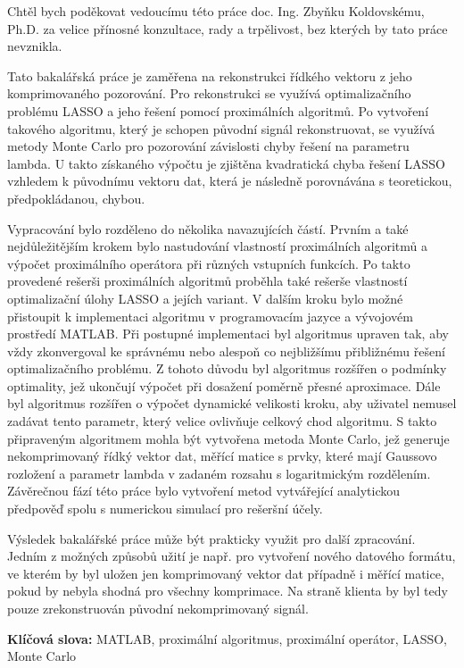 \documentclass[FM,BP]{tulthesis}
\begin{document}
\begin{acknowledgement}
Chtěl bych poděkovat vedoucímu této práce doc. Ing. Zbyňku Koldovskému, Ph.D. za velice přínosné konzultace, rady a trpělivost, bez kterých by tato práce nevznikla.
\end{acknowledgement}
\clearpage
\begin{abstractCZ}
Tato bakalářská práce je zaměřena na rekonstrukci řídkého vektoru z jeho komprimovaného pozorování. Pro rekonstrukci se využívá optimalizačního problému LASSO a jeho řešení pomocí proximálních algoritmů. Po vytvoření takového algoritmu, který je schopen původní signál rekonstruovat, se využívá metody Monte Carlo pro pozorování závislosti chyby řešení na parametru lambda. U takto získaného výpočtu je zjištěna kvadratická chyba řešení LASSO vzhledem k původnímu vektoru dat, která je následně porovnávána s teoretickou, předpokládanou, chybou.


Vypracování bylo rozděleno do několika navazujících částí. Prvním a také nejdůležitějším krokem bylo nastudování vlastností proximálních algoritmů a výpočet proximálního operátora při různých vstupních funkcích. Po takto provedené rešerši proximálních algoritmů proběhla také rešerše vlastností optimalizační úlohy LASSO a jejích variant. V dalším kroku bylo možné přistoupit k implementaci algoritmu v programovacím jazyce a vývojovém prostředí MATLAB. Při postupné implementaci byl algoritmus upraven tak, aby vždy zkonvergoval ke správnému nebo alespoň co nejbližšímu přibližnému řešení optimalizačního problému. Z tohoto důvodu byl algoritmus rozšířen o podmínky optimality, jež ukončují výpočet při dosažení poměrně přesné aproximace. Dále byl algoritmus rozšířen o výpočet dynamické velikosti kroku, aby uživatel nemusel zadávat tento parametr, který velice ovlivňuje celkový chod algoritmu. S takto připraveným algoritmem mohla být vytvořena metoda Monte Carlo, jež generuje nekomprimovaný řídký vektor dat, měřící matice s prvky, které mají Gaussovo rozložení a parametr lambda v zadaném rozsahu s logaritmickým rozdělením. Závěrečnou fází této práce bylo vytvoření metod vytvářející analytickou předpověď spolu s numerickou simulací pro rešeršní účely.


Výsledek bakalářské práce může být prakticky využit pro další zpracování. Jedním z možných způsobů užití je např. pro vytvoření nového datového formátu, ve kterém by byl uložen jen komprimovaný vektor dat případně i měřící matice, pokud by nebyla shodná pro všechny komprimace. Na straně klienta by byl tedy pouze zrekonstruován původní nekomprimovaný signál.


\textbf{Klíčová slova:} MATLAB, proximální algoritmus, proximální operátor, LASSO, Monte Carlo
\end{abstractCZ}
\end{document}

